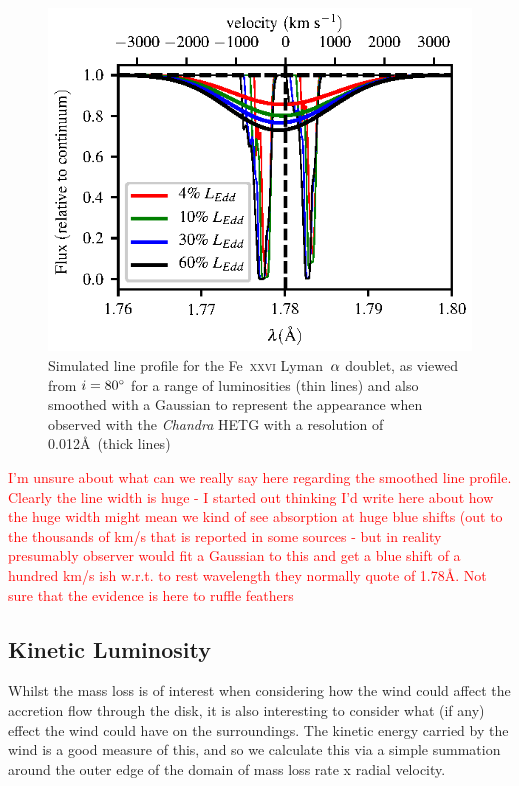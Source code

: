 \documentclass[a4paper,fleqn,usenatbib]{mnras}
\begin{document}
\begin{figure}
\includegraphics[width=\columnwidth]{figures/80_degrees_fe26_smooth.eps}
\caption{Simulated line profile for the Fe~\textsc{xxvi} Lyman~$\rm{\alpha}$
doublet, as viewed from $i = 80\degree$ for a range
of luminosities (thin lines) and also smoothed with a Gaussian to represent the appearance when
observed with the \emph{Chandra} HETG with a resolution of 0.012\AA~(thick lines)}
\label{figure:line26_smooth}
\end{figure}

\textcolor{red}{I'm unsure about what can we really say
here regarding the smoothed line profile. Clearly the line width is huge - I started out thinking I'd 
write here about how the 
huge width might mean we kind of see absorption at huge blue shifts (out to the thousands of km/s 
that is reported in some sources - but in reality presumably
observer would fit a Gaussian to this and get a blue shift of a hundred km/s ish w.r.t. to rest
wavelength they normally quote of 1.78\AA. Not sure that the evidence is here to ruffle feathers}







\subsection{Kinetic Luminosity}
Whilst the mass loss is of interest when considering how the wind could affect the 
accretion flow through the disk, it is also interesting to consider what (if any) effect the
wind could have on the surroundings. The kinetic energy carried by the wind is a
good measure of this, and so we calculate this via a simple summation around the outer
edge of the domain of mass loss rate x radial velocity. 
\end{document}
